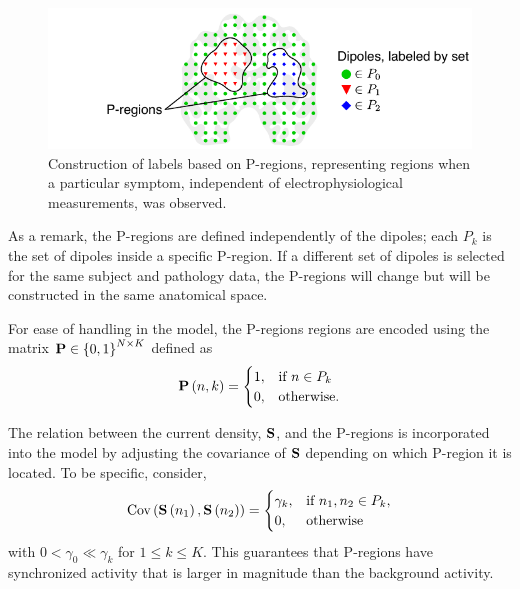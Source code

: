 \begin{figure}
    \centering 
    \includegraphics{./img/Pregions.pdf}
    \caption{Construction of labels based on P-regions, representing regions when a particular symptom, independent of electrophysiological measurements, was observed.}
\end{figure}

As a remark, the P-regions are defined independently of the dipoles; each $P_k$ is the set of dipoles inside a specific P-region.
%
If a different set of dipoles is selected for the same subject and pathology data, the P-regions will change but will be constructed in the same anatomical space.

For ease of handling in the model, the P-regions regions are encoded using the matrix 
$\mathbf{P}\in \left\{ 0,1 \right\}^{N\times K}$ defined as
\begin{equation}
    \mathbf{P}\left( n,k \right) = \begin{cases}
        1, &\text{if } n \in P_k \\
        0, &\text{otherwise.}
    \end{cases}
\end{equation}



The relation between the current density, $\mathbf{S}$, and the P-regions is incorporated into the model by adjusting the covariance of $\mathbf{S}$ depending on which P-region it is located.
%
To be specific, consider,
\begin{equation}
    \text{Cov}\left( \mathbf{S}\left( n_1 \right), \mathbf{S}\left( n_2 \right) \right) = 
    \begin{cases}
        \gamma_k, & \text{if } n_1, n_2\in P_k, \\
        0, & \text{otherwise}
    \end{cases}
\end{equation}
with $0 < \gamma_0 \ll \gamma_k$ for $1\leq k \leq K$.
%
This guarantees that P-regions have synchronized activity that is larger in magnitude than the background activity.

